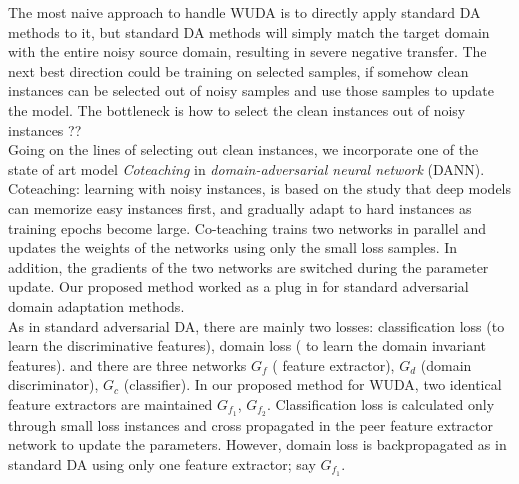 The most naive approach to handle WUDA is to directly apply standard DA methods to it, but standard DA methods will simply match the target domain with the entire noisy
source domain, resulting in severe negative transfer. The next best direction could be training on selected samples, if somehow clean instances can be selected out of noisy samples and use those samples to update the model. The bottleneck is how to select the clean instances out of noisy instances ??\\
Going on the lines of selecting out clean instances, we incorporate one of the state of art model \textit{Coteaching}\cite{coteaching} in \textit{domain-adversarial neural network} (DANN)\cite{dann}. Coteaching: learning with noisy instances, is based on the study that deep models can memorize easy instances first, and gradually adapt to hard instances as training epochs become large\cite{memorization}. Co-teaching trains two networks in parallel and
updates the weights of the networks using only the small loss samples. In addition, the
gradients of the two networks are switched during the parameter update. Our proposed method worked as a plug in for standard adversarial domain adaptation methods.\\

As in standard adversarial DA, there are mainly two losses: classification loss (to learn the discriminative features), domain loss ( to learn the domain invariant features). and there are three networks $G_f$ ( feature extractor), $G_d$ (domain discriminator), $G_c$ (classifier). In our proposed method for WUDA, two identical feature extractors are maintained $G_{f_{1}}$, $G_{f_{2}}$. Classification loss is calculated only through small loss instances and cross propagated in the peer feature extractor network to update the parameters. However, domain loss is backpropagated as in standard DA using only one feature extractor; say $G_{f_{1}}$.